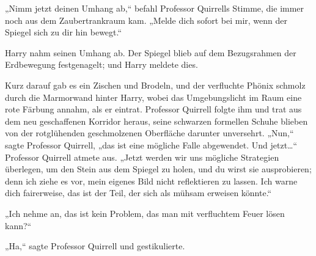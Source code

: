 „Nimm jetzt deinen Umhang ab,“ befahl Professor Quirrells Stimme, die immer noch aus dem Zaubertrankraum kam. „Melde dich sofort bei mir, wenn der Spiegel sich zu dir hin bewegt.“

Harry nahm seinen Umhang ab.
Der Spiegel blieb auf dem Bezugsrahmen der Erdbewegung festgenagelt; und Harry meldete dies.

Kurz darauf gab es ein Zischen und Brodeln, und der verfluchte Phönix schmolz durch die Marmorwand hinter Harry, wobei das Umgebungslicht im Raum eine rote Färbung annahm, als er eintrat. Professor Quirrell folgte ihm und trat aus dem neu geschaffenen Korridor heraus, seine schwarzen formellen Schuhe blieben von der rotglühenden geschmolzenen Oberfläche darunter unversehrt.
„Nun,“ sagte Professor Quirrell, „das ist eine mögliche Falle abgewendet. Und jetzt…“ Professor Quirrell atmete aus. „Jetzt werden wir uns mögliche Strategien überlegen, um den Stein aus dem Spiegel zu holen, und du wirst sie ausprobieren; denn ich ziehe es vor, mein eigenes Bild nicht reflektieren zu lassen. Ich warne dich fairerweise, das ist der Teil, der sich als mühsam erweisen könnte.“

„Ich nehme an, das ist kein Problem, das man mit verfluchtem Feuer lösen kann?“

„Ha,“ sagte Professor Quirrell und gestikulierte.

